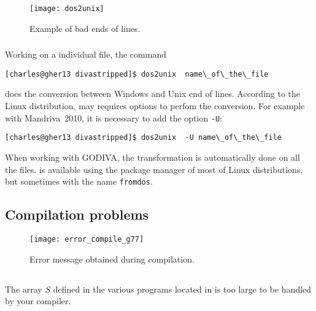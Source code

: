 \begin{figure}[htpb]
\centering
\texttt{[image: dos2unix]}
\caption{Example of bad ends of lines.\label{fig:error_dos2unix2}}
\end{figure}


\subsubsection{\answer}

Working on a individual file, the command\\

\begin{lstlisting}[style=Bash]
[charles@gher13 divastripped]$ dos2unix  name\_of\_the\_file
\end{lstlisting}
does the conversion between Windows and Unix end of lines. According to the Linux distribution,  may requires options to perfom the conversion. For example with Mandriva~2010, it is necessary to add the option \texttt{-U}:

\begin{lstlisting}[style=Bash]
[charles@gher13 divastripped]$ dos2unix  -U name\_of\_the\_file
\end{lstlisting}

When working with GODIVA, the transformation is automatically done on all the files.  is available using the package manager of most of Linux distributions, but sometimes with the name \texttt{fromdos}.


\subsection{Compilation problems\label{sec:error_compile}}

\begin{figure}[htpb]
\centering
\texttt{[image: error\_compile\_g77]}
\caption{Error message obtained during compilation. \label{fig:error_compile}}
\end{figure}

\subsection{\question}

The array $S$ defined in the various programs located in  is too large to be handled by your compiler. 


